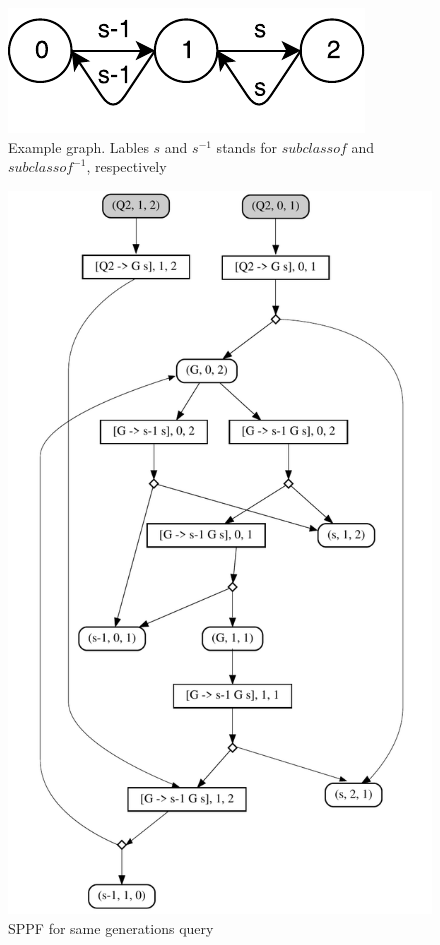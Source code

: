 \begin{figure}[h]
\includegraphics{graph}
\caption{Example graph. Lables $s$ and $s^{-1}$ stands for $subclassof$ and $subclassof^{-1}$, respectively}
\label{fig:graph}
\end{figure}

\begin{figure}[h]
\includegraphics[scale=0.5]{sppf}
\caption{SPPF for same generations query}
\label{fig:sppf}
\end{figure}


